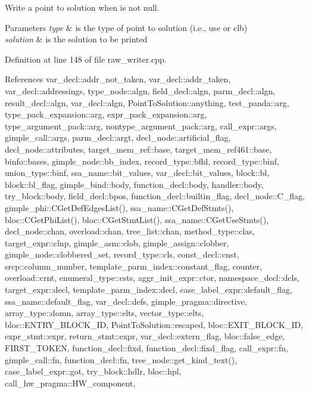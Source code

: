 Write a point to solution when is not null. 


\begin{DoxyParams}{Parameters}
{\em type} & is the type of point to solution (i.\+e., use or clb) \\
\hline
{\em solution} & is the solution to be printed \\
\hline
\end{DoxyParams}


Definition at line 148 of file raw\+\_\+writer.\+cpp.



References var\+\_\+decl\+::addr\+\_\+not\+\_\+taken, var\+\_\+decl\+::addr\+\_\+taken, var\+\_\+decl\+::addressings, type\+\_\+node\+::algn, field\+\_\+decl\+::algn, parm\+\_\+decl\+::algn, result\+\_\+decl\+::algn, var\+\_\+decl\+::algn, Point\+To\+Solution\+::anything, test\+\_\+panda\+::arg, type\+\_\+pack\+\_\+expansion\+::arg, expr\+\_\+pack\+\_\+expansion\+::arg, type\+\_\+argument\+\_\+pack\+::arg, nontype\+\_\+argument\+\_\+pack\+::arg, call\+\_\+expr\+::args, gimple\+\_\+call\+::args, parm\+\_\+decl\+::argt, decl\+\_\+node\+::artificial\+\_\+flag, decl\+\_\+node\+::attributes, target\+\_\+mem\+\_\+ref\+::base, target\+\_\+mem\+\_\+ref461\+::base, binfo\+::bases, gimple\+\_\+node\+::bb\+\_\+index, record\+\_\+type\+::bfld, record\+\_\+type\+::binf, union\+\_\+type\+::binf, ssa\+\_\+name\+::bit\+\_\+values, var\+\_\+decl\+::bit\+\_\+values, block\+::bl, block\+::bl\+\_\+flag, gimple\+\_\+bind\+::body, function\+\_\+decl\+::body, handler\+::body, try\+\_\+block\+::body, field\+\_\+decl\+::bpos, function\+\_\+decl\+::builtin\+\_\+flag, decl\+\_\+node\+::\+C\+\_\+flag, gimple\+\_\+phi\+::\+C\+Get\+Def\+Edges\+List(), ssa\+\_\+name\+::\+C\+Get\+Def\+Stmts(), bloc\+::\+C\+Get\+Phi\+List(), bloc\+::\+C\+Get\+Stmt\+List(), ssa\+\_\+name\+::\+C\+Get\+Use\+Stmts(), decl\+\_\+node\+::chan, overload\+::chan, tree\+\_\+list\+::chan, method\+\_\+type\+::clas, target\+\_\+expr\+::clnp, gimple\+\_\+asm\+::clob, gimple\+\_\+assign\+::clobber, gimple\+\_\+node\+::clobbered\+\_\+set, record\+\_\+type\+::cls, const\+\_\+decl\+::cnst, srcp\+::column\+\_\+number, template\+\_\+parm\+\_\+index\+::constant\+\_\+flag, counter, overload\+::crnt, enumeral\+\_\+type\+::csts, aggr\+\_\+init\+\_\+expr\+::ctor, namespace\+\_\+decl\+::dcls, target\+\_\+expr\+::decl, template\+\_\+parm\+\_\+index\+::decl, case\+\_\+label\+\_\+expr\+::default\+\_\+flag, ssa\+\_\+name\+::default\+\_\+flag, var\+\_\+decl\+::defs, gimple\+\_\+pragma\+::directive, array\+\_\+type\+::domn, array\+\_\+type\+::elts, vector\+\_\+type\+::elts, bloc\+::\+E\+N\+T\+R\+Y\+\_\+\+B\+L\+O\+C\+K\+\_\+\+ID, Point\+To\+Solution\+::escaped, bloc\+::\+E\+X\+I\+T\+\_\+\+B\+L\+O\+C\+K\+\_\+\+ID, expr\+\_\+stmt\+::expr, return\+\_\+stmt\+::expr, var\+\_\+decl\+::extern\+\_\+flag, bloc\+::false\+\_\+edge, F\+I\+R\+S\+T\+\_\+\+T\+O\+K\+EN, function\+\_\+decl\+::fixd, function\+\_\+decl\+::fixd\+\_\+flag, call\+\_\+expr\+::fn, gimple\+\_\+call\+::fn, function\+\_\+decl\+::fn, tree\+\_\+node\+::get\+\_\+kind\+\_\+text(), case\+\_\+label\+\_\+expr\+::got, try\+\_\+block\+::hdlr, bloc\+::hpl, call\+\_\+hw\+\_\+pragma\+::\+H\+W\+\_\+component, 